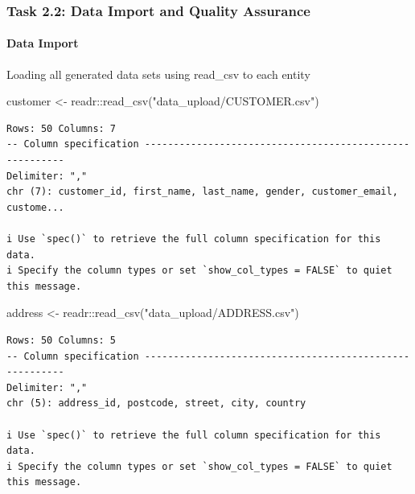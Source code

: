 \documentclass[
  letterpaper,
  DIV=11,
  numbers=noendperiod]{scrartcl}
\let\oldparagraph\paragraph
\renewcommand{\paragraph}[1]{\oldparagraph{#1}\mbox{}}
\newenvironment{Shaded}{\begin{snugshade}}{\end{snugshade}}
\newcommand{\FunctionTok}[1]{\textcolor[rgb]{0.28,0.35,0.67}{#1}}
\newcommand{\NormalTok}[1]{\textcolor[rgb]{0.00,0.23,0.31}{#1}}
\newcommand{\OtherTok}[1]{\textcolor[rgb]{0.00,0.23,0.31}{#1}}
\newcommand{\SpecialCharTok}[1]{\textcolor[rgb]{0.37,0.37,0.37}{#1}}
\newcommand{\StringTok}[1]{\textcolor[rgb]{0.13,0.47,0.30}{#1}}
\begin{document}
\hypertarget{task-2.2-data-import-and-quality-assurance}{%
\subsubsection{Task 2.2: Data Import and Quality
Assurance}\label{task-2.2-data-import-and-quality-assurance}}

\hypertarget{data-import}{%
\paragraph{Data Import}\label{data-import}}

Loading all generated data sets using read\_csv to each entity

\begin{Shaded}
\begin{Highlighting}[]
\NormalTok{customer }\OtherTok{\textless{}{-}}\NormalTok{ readr}\SpecialCharTok{::}\FunctionTok{read\_csv}\NormalTok{(}\StringTok{"data\_upload/CUSTOMER.csv"}\NormalTok{)}
\end{Highlighting}
\end{Shaded}

\begin{verbatim}
Rows: 50 Columns: 7
-- Column specification --------------------------------------------------------
Delimiter: ","
chr (7): customer_id, first_name, last_name, gender, customer_email, custome...

i Use `spec()` to retrieve the full column specification for this data.
i Specify the column types or set `show_col_types = FALSE` to quiet this message.
\end{verbatim}

\begin{Shaded}
\begin{Highlighting}[]
\NormalTok{address }\OtherTok{\textless{}{-}}\NormalTok{ readr}\SpecialCharTok{::}\FunctionTok{read\_csv}\NormalTok{(}\StringTok{"data\_upload/ADDRESS.csv"}\NormalTok{)}
\end{Highlighting}
\end{Shaded}

\begin{verbatim}
Rows: 50 Columns: 5
-- Column specification --------------------------------------------------------
Delimiter: ","
chr (5): address_id, postcode, street, city, country

i Use `spec()` to retrieve the full column specification for this data.
i Specify the column types or set `show_col_types = FALSE` to quiet this message.
\end{verbatim}
\end{document}

